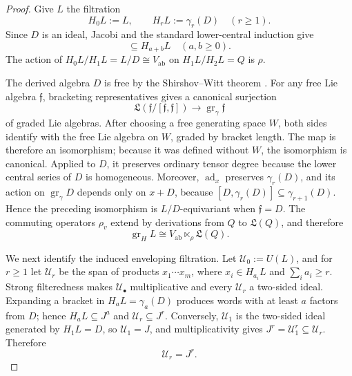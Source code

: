 \documentclass[10pt,reqno]{amsart}
\theoremstyle{plain}
\theoremstyle{definition}
\theoremstyle{remark}
\begin{document}
\begin{proof}
Give \(L\) the filtration
\[
 H_0L:=L,\qquad H_rL:=\gamma_r(D)\quad(r\geq1).
\]
Since \(D\) is an ideal, Jacobi and the standard lower-central induction
give
\begin{equation}
 [H_aL,H_bL]\subseteq H_{a+b}L
 \quad(a,b\geq0).
 \label{cc:eq-strong-filtration}
\end{equation}
The action of \(H_0L/H_1L=L/D\cong V_{\mathrm{ab}}\) on
\(H_1L/H_2L=Q\) is \(\rho\).

The derived algebra \(D\) is free by the Shirshov--Witt theorem
\cite[\S2.2]{Reutenauer93}.  For any free Lie algebra \(\mathfrak f\),
bracketing representatives gives a canonical surjection
\[
 {\mathfrak L}\!\left(\mathfrak f/[\mathfrak f,\mathfrak f]\right)
 \longrightarrow {\operatorname{gr}}_\gamma\mathfrak f
\]
of graded Lie algebras.  After choosing a free generating space \(W\),
both sides identify with the free Lie algebra on \(W\), graded by bracket
length.  The map is therefore an isomorphism; because it was defined
without \(W\), the isomorphism is canonical.  Applied to \(D\), it
preserves ordinary tensor degree because the lower central series of
\(D\) is homogeneous.
Moreover,
\({\operatorname{ad}}_x\) preserves
\(\gamma_r(D)\), and its action on \({\operatorname{gr}}_\gamma D\) depends only on
\(x+D\), because
\([D,\gamma_r(D)]\subseteq\gamma_{r+1}(D)\).  Hence the preceding
isomorphism is \(L/D\)-equivariant when \(\mathfrak f=D\).  The
commuting operators \(\rho_v\) extend by derivations from \(Q\) to
\({\mathfrak L}(Q)\), and therefore
\begin{equation}
 {\operatorname{gr}}_HL\cong V_{\mathrm{ab}}\ltimes_\rho{\mathfrak L}(Q).
 \label{cc:eq-graded-lie}
\end{equation}

We next identify the induced enveloping filtration.
Let \(\mathcal U_0:=U(L)\), and for \(r\geq1\) let \(\mathcal U_r\) be
the span of products
\(x_1\cdots x_m\), where \(x_i\in H_{a_i}L\) and
\(\sum_i a_i\geq r\).  Strong filteredness makes
\(\mathcal U_\bullet\) multiplicative and every \(\mathcal U_r\) a
two-sided ideal.  Expanding a bracket in
\(H_aL=\gamma_a(D)\) produces words with at least \(a\) factors from
\(D\); hence \(H_aL\subseteq J^a\) and
\(\mathcal U_r\subseteq J^r\).  Conversely, \(\mathcal U_1\) is the
two-sided ideal generated by \(H_1L=D\), so \(\mathcal U_1=J\), and
multiplicativity gives \(J^r=\mathcal U_1^r\subseteq\mathcal U_r\).
Therefore
\begin{equation}
 \mathcal U_r=J^r.
 \label{cc:eq-induced-is-j}
\end{equation}


\end{proof}
\end{document}
